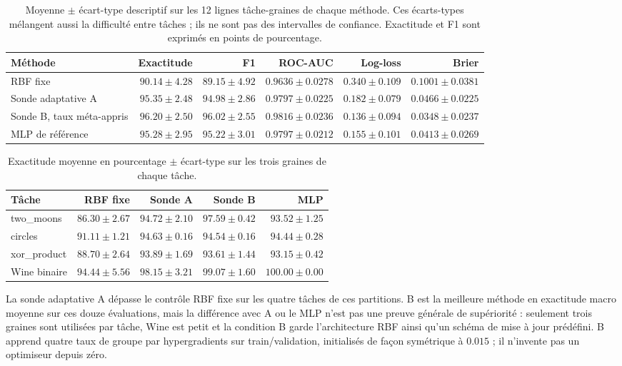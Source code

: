\documentclass[11pt,a4paper]{article}
\begin{document}
\begin{table}[H]
\centering\scriptsize
\setlength{\tabcolsep}{4pt}
\begin{tabular}{lrrrrr}
\toprule
Méthode & Exactitude & F1 & ROC-AUC & Log-loss & Brier \\
\midrule
RBF fixe & $90.14\pm4.28$ & $89.15\pm4.92$ & $0.9636\pm0.0278$ & $0.340\pm0.109$ & $0.1001\pm0.0381$ \\
Sonde adaptative A & $95.35\pm2.48$ & $94.98\pm2.86$ & $0.9797\pm0.0225$ & $0.182\pm0.079$ & $0.0466\pm0.0225$ \\
Sonde B, taux méta-appris & $96.20\pm2.50$ & $96.02\pm2.55$ & $0.9816\pm0.0236$ & $0.136\pm0.094$ & $0.0348\pm0.0237$ \\
MLP de référence & $95.28\pm2.95$ & $95.22\pm3.01$ & $0.9797\pm0.0212$ & $0.155\pm0.101$ & $0.0413\pm0.0269$ \\
\bottomrule
\end{tabular}
\caption{Moyenne $\pm$ écart-type descriptif sur les 12 lignes tâche-graines de chaque méthode. Ces écarts-types mélangent aussi la difficulté entre tâches ; ils ne sont pas des intervalles de confiance. Exactitude et F1 sont exprimés en points de pourcentage.}
\label{tab:v12_class_macro}
\end{table}

\begin{table}[H]
\centering\scriptsize
\setlength{\tabcolsep}{3.3pt}
\begin{tabular}{lrrrr}
\toprule
Tâche & RBF fixe & Sonde A & Sonde B & MLP \\
\midrule
two\_moons & $86.30\pm2.67$ & $94.72\pm2.10$ & $97.59\pm0.42$ & $93.52\pm1.25$ \\
circles & $91.11\pm1.21$ & $94.63\pm0.16$ & $94.54\pm0.16$ & $94.44\pm0.28$ \\
xor\_product & $88.70\pm2.64$ & $93.89\pm1.69$ & $93.61\pm1.44$ & $93.15\pm0.42$ \\
Wine binaire & $94.44\pm5.56$ & $98.15\pm3.21$ & $99.07\pm1.60$ & $100.00\pm0.00$ \\
\bottomrule
\end{tabular}
\caption{Exactitude moyenne en pourcentage $\pm$ écart-type sur les trois graines de chaque tâche.}
\label{tab:v12_class_tasks}
\end{table}

La sonde adaptative A dépasse le contrôle RBF fixe sur les quatre tâches de ces partitions. B est la meilleure méthode en exactitude macro moyenne sur ces douze évaluations, mais la différence avec A ou le MLP n'est pas une preuve générale de supériorité : seulement trois graines sont utilisées par tâche, Wine est petit et la condition B garde l'architecture RBF ainsi qu'un schéma de mise à jour prédéfini. B apprend quatre taux de groupe par hypergradients sur train/validation, initialisés de façon symétrique à $0.015$ ; il n'invente pas un optimiseur depuis zéro.
\end{document}
